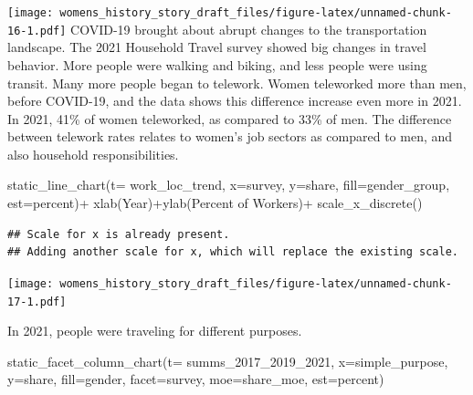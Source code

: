 \documentclass[
  12pt,
]{article}
\newenvironment{Shaded}{\begin{snugshade}}{\end{snugshade}}
\newcommand{\AttributeTok}[1]{\textcolor[rgb]{0.77,0.63,0.00}{#1}}
\newcommand{\FunctionTok}[1]{\textcolor[rgb]{0.00,0.00,0.00}{#1}}
\newcommand{\NormalTok}[1]{#1}
\newcommand{\SpecialCharTok}[1]{\textcolor[rgb]{0.00,0.00,0.00}{#1}}
\newcommand{\StringTok}[1]{\textcolor[rgb]{0.31,0.60,0.02}{#1}}
\begin{document}
\begin{flushleft}
\texttt{[image: womens\_history\_story\_draft\_files/figure-latex/unnamed-chunk-16-1.pdf]}
COVID-19 brought about abrupt changes to the transportation landscape.
The 2021 Household Travel survey showed big changes in travel behavior.
More people were walking and biking, and less people were using transit.
Many more people began to telework. Women teleworked more than men,
before COVID-19, and the data shows this difference increase even more
in 2021. In 2021, 41\% of women teleworked, as compared to 33\% of men.
The difference between telework rates relates to women's job sectors as
compared to men, and also household responsibilities.

\begin{Shaded}
\begin{Highlighting}[]
\FunctionTok{static\_line\_chart}\NormalTok{(}\AttributeTok{t=}\NormalTok{ work\_loc\_trend, }\AttributeTok{x=}\StringTok{\textquotesingle{}survey\textquotesingle{}}\NormalTok{, }\AttributeTok{y=}\StringTok{\textquotesingle{}share\textquotesingle{}}\NormalTok{,  }\AttributeTok{fill=}\StringTok{\textquotesingle{}gender\_group\textquotesingle{}}\NormalTok{, }\AttributeTok{est=}\StringTok{\textquotesingle{}percent\textquotesingle{}}\NormalTok{)}\SpecialCharTok{+}
                                \FunctionTok{xlab}\NormalTok{(}\StringTok{\textquotesingle{}Year\textquotesingle{}}\NormalTok{)}\SpecialCharTok{+}\FunctionTok{ylab}\NormalTok{(}\StringTok{\textquotesingle{}Percent of Workers\textquotesingle{}}\NormalTok{)}\SpecialCharTok{+}
                                \FunctionTok{scale\_x\_discrete}\NormalTok{()}
\end{Highlighting}
\end{Shaded}

\begin{verbatim}
## Scale for x is already present.
## Adding another scale for x, which will replace the existing scale.
\end{verbatim}

\texttt{[image: womens\_history\_story\_draft\_files/figure-latex/unnamed-chunk-17-1.pdf]}

In 2021, people were traveling for different purposes.

\begin{Shaded}
\begin{Highlighting}[]
\FunctionTok{static\_facet\_column\_chart}\NormalTok{(}\AttributeTok{t=}\NormalTok{ summs\_2017\_2019\_2021, }\AttributeTok{x=}\StringTok{\textquotesingle{}simple\_purpose\textquotesingle{}}\NormalTok{, }\AttributeTok{y=}\StringTok{\textquotesingle{}share\textquotesingle{}}\NormalTok{,  }\AttributeTok{fill=}\StringTok{\textquotesingle{}gender\textquotesingle{}}\NormalTok{, }\AttributeTok{facet=}\StringTok{\textquotesingle{}survey\textquotesingle{}}\NormalTok{, }\AttributeTok{moe=}\StringTok{\textquotesingle{}share\_moe\textquotesingle{}}\NormalTok{, }\AttributeTok{est=}\StringTok{\textquotesingle{}percent\textquotesingle{}}\NormalTok{)}
\end{Highlighting}
\end{Shaded}


\end{flushleft}
\end{document}
